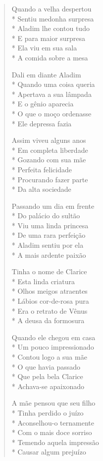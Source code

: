 \begin{verse}
Quando a velha despertou\\*
Sentiu medonha surpresa\\*
Aladim lhe contou tudo\\*
E para maior surpresa\\*
Ela viu em sua sala\\*
A comida sobre a mesa

Dali em diante Aladim\\*
Quando uma coisa queria\\*
Apertava a sua lâmpada\\*
E o gênio aparecia\\*
O que o moço ordenasse\\*
Ele depressa fazia

Assim viveu alguns anos\\*
Em completa liberdade\\*
Gozando com sua mãe\\*
Perfeita felicidade\\*
Procurando fazer parte\\*
Da alta sociedade

Passando um dia em frente\\*
Do palácio do sultão\\*
Viu uma linda princesa\\*
De uma rara perfeição\\*
Aladim sentiu por ela\\*
A mais ardente paixão

Tinha o nome de Clarice\\*
Esta linda criatura\\*
Olhos meigos atraentes\\*
Lábios cor-de-rosa pura\\*
Era o retrato de Vênus\\*
A deusa da formosura

Quando ele chegou em casa\\*
Um pouco impressionado\\*
Contou logo a sua mãe\\*
O que havia passado\\*
Que pela bela Clarice\\*
Achava-se apaixonado

A mãe pensou que seu filho\\*
Tinha perdido o juízo\\*
Aconselhou-o ternamente\\*
Com o mais doce sorriso\\*
Temendo aquela impressão\\*
Causar algum prejuízo


\end{verse}
